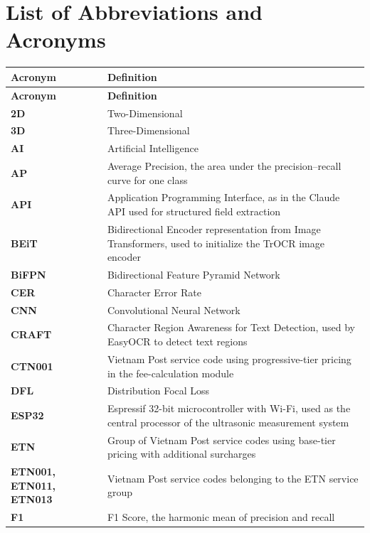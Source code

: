 \chapter*{List of Abbreviations and Acronyms}

\renewcommand{\arraystretch}{1.25}
\begin{longtable}{|>{\raggedright\arraybackslash}p{3.4cm}|>{\raggedright\arraybackslash}p{10.4cm}|}
\hline
\textbf{Acronym} & \textbf{Definition} \\
\hline
\endfirsthead
\hline
\textbf{Acronym} & \textbf{Definition} \\
\hline
\endhead
\hline
\endfoot
\hline
\endlastfoot

\textbf{2D} & Two-Dimensional \\
\hline
\textbf{3D} & Three-Dimensional \\
\hline
\textbf{AI} & Artificial Intelligence \\
\hline
\textbf{AP} & Average Precision, the area under the precision--recall curve for one class \\
\hline
\textbf{API} & Application Programming Interface, as in the Claude API used for structured field extraction \\
\hline
\textbf{BEiT} & Bidirectional Encoder representation from Image Transformers, used to initialize the TrOCR image encoder \\
\hline
\textbf{BiFPN} & Bidirectional Feature Pyramid Network \\
\hline
\textbf{CER} & Character Error Rate \\
\hline
\textbf{CNN} & Convolutional Neural Network \\
\hline
\textbf{CRAFT} & Character Region Awareness for Text Detection, used by EasyOCR to detect text regions \\
\hline
\textbf{CTN001} & Vietnam Post service code using progressive-tier pricing in the fee-calculation module \\
\hline
\textbf{DFL} & Distribution Focal Loss \\
\hline
\textbf{ESP32} & Espressif 32-bit microcontroller with Wi-Fi, used as the central processor of the ultrasonic measurement system \\
\hline
\textbf{ETN} & Group of Vietnam Post service codes using base-tier pricing with additional surcharges \\
\hline
\textbf{ETN001, ETN011, ETN013} & Vietnam Post service codes belonging to the ETN service group \\
\hline
\textbf{F1} & F1 Score, the harmonic mean of precision and recall \\

\end{longtable}
